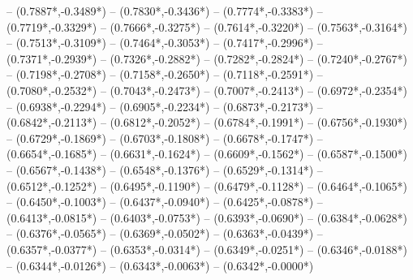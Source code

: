 {	-- ({0.7887*\dx},{-0.3489*\dy})
	-- ({0.7830*\dx},{-0.3436*\dy})
	-- ({0.7774*\dx},{-0.3383*\dy})
	-- ({0.7719*\dx},{-0.3329*\dy})
	-- ({0.7666*\dx},{-0.3275*\dy})
	-- ({0.7614*\dx},{-0.3220*\dy})
	-- ({0.7563*\dx},{-0.3164*\dy})
	-- ({0.7513*\dx},{-0.3109*\dy})
	-- ({0.7464*\dx},{-0.3053*\dy})
	-- ({0.7417*\dx},{-0.2996*\dy})
	-- ({0.7371*\dx},{-0.2939*\dy})
	-- ({0.7326*\dx},{-0.2882*\dy})
	-- ({0.7282*\dx},{-0.2824*\dy})
	-- ({0.7240*\dx},{-0.2767*\dy})
	-- ({0.7198*\dx},{-0.2708*\dy})
	-- ({0.7158*\dx},{-0.2650*\dy})
	-- ({0.7118*\dx},{-0.2591*\dy})
	-- ({0.7080*\dx},{-0.2532*\dy})
	-- ({0.7043*\dx},{-0.2473*\dy})
	-- ({0.7007*\dx},{-0.2413*\dy})
	-- ({0.6972*\dx},{-0.2354*\dy})
	-- ({0.6938*\dx},{-0.2294*\dy})
	-- ({0.6905*\dx},{-0.2234*\dy})
	-- ({0.6873*\dx},{-0.2173*\dy})
	-- ({0.6842*\dx},{-0.2113*\dy})
	-- ({0.6812*\dx},{-0.2052*\dy})
	-- ({0.6784*\dx},{-0.1991*\dy})
	-- ({0.6756*\dx},{-0.1930*\dy})
	-- ({0.6729*\dx},{-0.1869*\dy})
	-- ({0.6703*\dx},{-0.1808*\dy})
	-- ({0.6678*\dx},{-0.1747*\dy})
	-- ({0.6654*\dx},{-0.1685*\dy})
	-- ({0.6631*\dx},{-0.1624*\dy})
	-- ({0.6609*\dx},{-0.1562*\dy})
	-- ({0.6587*\dx},{-0.1500*\dy})
	-- ({0.6567*\dx},{-0.1438*\dy})
	-- ({0.6548*\dx},{-0.1376*\dy})
	-- ({0.6529*\dx},{-0.1314*\dy})
	-- ({0.6512*\dx},{-0.1252*\dy})
	-- ({0.6495*\dx},{-0.1190*\dy})
	-- ({0.6479*\dx},{-0.1128*\dy})
	-- ({0.6464*\dx},{-0.1065*\dy})
	-- ({0.6450*\dx},{-0.1003*\dy})
	-- ({0.6437*\dx},{-0.0940*\dy})
	-- ({0.6425*\dx},{-0.0878*\dy})
	-- ({0.6413*\dx},{-0.0815*\dy})
	-- ({0.6403*\dx},{-0.0753*\dy})
	-- ({0.6393*\dx},{-0.0690*\dy})
	-- ({0.6384*\dx},{-0.0628*\dy})
	-- ({0.6376*\dx},{-0.0565*\dy})
	-- ({0.6369*\dx},{-0.0502*\dy})
	-- ({0.6363*\dx},{-0.0439*\dy})
	-- ({0.6357*\dx},{-0.0377*\dy})
	-- ({0.6353*\dx},{-0.0314*\dy})
	-- ({0.6349*\dx},{-0.0251*\dy})
	-- ({0.6346*\dx},{-0.0188*\dy})
	-- ({0.6344*\dx},{-0.0126*\dy})
	-- ({0.6343*\dx},{-0.0063*\dy})
	-- ({0.6342*\dx},{-0.0000*\dy})
}
